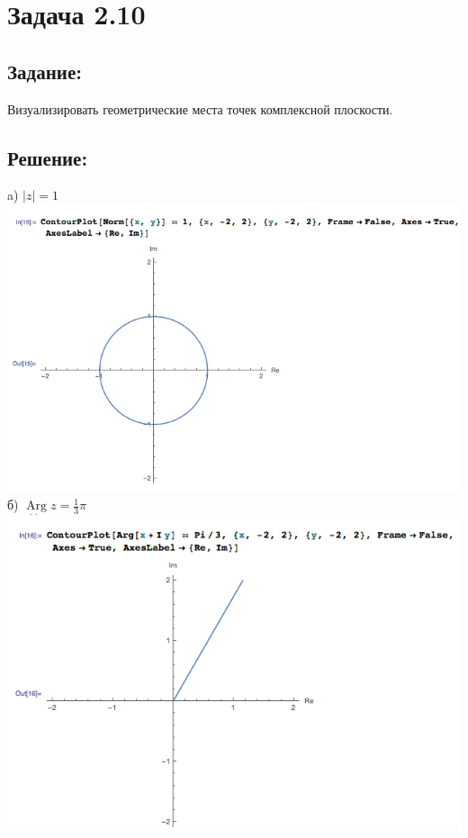 \section{Задача 2.10}
\subsection{Задание:}
Визуализировать геометрические места точек комплексной плоскости.
\subsection{Решение:}
a) $ |z| = 1 $
\\
\includegraphics[scale=0.6]{task/2_10/screen1.png}
\\
б) $ \operatorname{Arg} z = \frac{1}{3}\pi $
\\
\includegraphics[scale=0.6]{task/2_10/screen2.png}
\\
